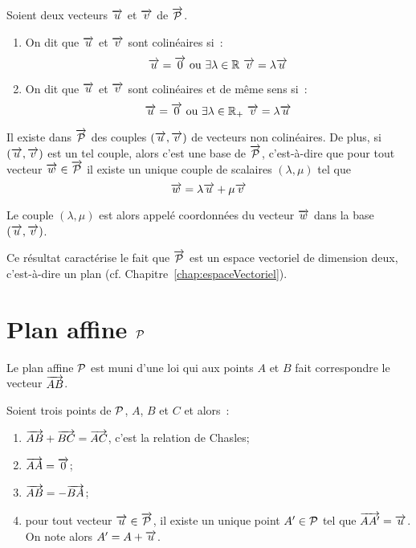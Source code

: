 \begin{defdef}
  Soient deux vecteurs \(\vu\) et \(\vv\) de \(\vect{\P}\).
  \begin{enumerate}
    \item On dit que \(\vu\) et \(\vv\) sont colinéaires si~:
      \begin{equation}
        \vu = \vect{0} \textrm{~ou~} \exists \lambda \in \R \ \vv=\lambda\vu
      \end{equation}
    \item On dit que \(\vu\) et \(\vv\) sont colinéaires et de même sens si~:
      \begin{equation}
        \vu = \vect{0} \textrm{~ou~} \exists \lambda \in \R_+ \ \vv=\lambda\vu
      \end{equation}
  \end{enumerate}
\end{defdef}

\begin{prop}
  Il existe dans \(\vect{\P}\) des couples \((\vu,\vv)\) de vecteurs non 
  colinéaires. De plus, si \((\vu,\vv)\) est un tel couple, alors c'est une base 
  de \(\vect{\P}\), c'est-à-dire que pour tout vecteur \(\vw \in \vect{\P}\) il 
  existe un unique couple de scalaires \((\lambda, \mu)\) tel que
  \begin{equation}
    \vw=\lambda \vu + \mu \vv
  \end{equation}
\end{prop}

\begin{defdef}
  Le couple \((\lambda,\mu)\) est alors appelé coordonnées du vecteur \(\vw\) dans 
  la base \((\vu,\vv)\).
\end{defdef}

Ce résultat caractérise le fait que \(\vect{\P}\) est un espace vectoriel de 
dimension deux, c'est-à-dire un plan (cf. Chapitre~\ref{chap:espaceVectoriel}).

\section{Plan affine \(\P\)}

Le plan affine \(\P\) est muni d'une loi qui aux points \(A\) et \(B\) fait 
correspondre le vecteur \(\vect{AB}\).

\begin{prop}
  Soient trois points de \(\P\), \(A\), \(B\) et \(C\) et alors~:
  \begin{enumerate}
    \item \(\vect{AB}+\vect{BC}=\vect{AC}\), c'est la relation de Chasles;
    \item \(\vect{AA}=\vect{0}\);
    \item \(\vect{AB}=-\vect{BA}\);
    \item pour tout vecteur \(\vu \in \vect{\P}\), il existe un unique point $A' 
      \in \P$ tel que \(\vect{AA'}=\vu\). On note alors \(A'=A+\vu\).
  \end{enumerate}
\end{prop}

